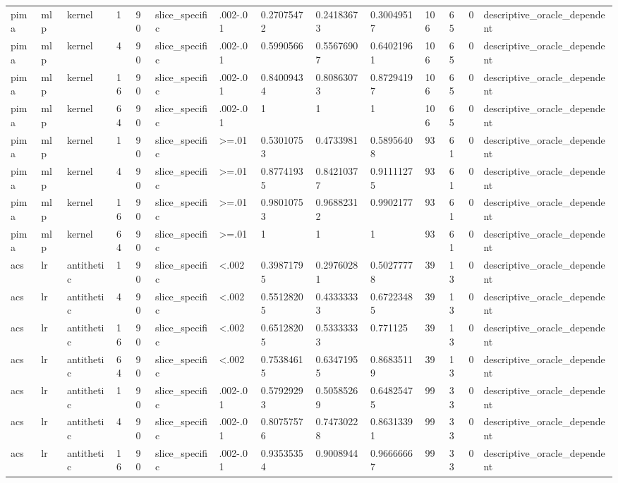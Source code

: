 \begin{tabular}{llllllllllllll}
pima & mlp & kernel & 1 & 90 & slice\_specific & .002-.01 & 0.27075472 & 0.24183673 & 0.30049517 & 106 & 65 & 0 & descriptive\_oracle\_dependent \\
pima & mlp & kernel & 4 & 90 & slice\_specific & .002-.01 & 0.5990566 & 0.55676907 & 0.64021961 & 106 & 65 & 0 & descriptive\_oracle\_dependent \\
pima & mlp & kernel & 16 & 90 & slice\_specific & .002-.01 & 0.84009434 & 0.80863073 & 0.87294197 & 106 & 65 & 0 & descriptive\_oracle\_dependent \\
pima & mlp & kernel & 64 & 90 & slice\_specific & .002-.01 & 1 & 1 & 1 & 106 & 65 & 0 & descriptive\_oracle\_dependent \\
pima & mlp & kernel & 1 & 90 & slice\_specific & >=.01 & 0.53010753 & 0.4733981 & 0.58956408 & 93 & 61 & 0 & descriptive\_oracle\_dependent \\
pima & mlp & kernel & 4 & 90 & slice\_specific & >=.01 & 0.87741935 & 0.84210377 & 0.91111275 & 93 & 61 & 0 & descriptive\_oracle\_dependent \\
pima & mlp & kernel & 16 & 90 & slice\_specific & >=.01 & 0.98010753 & 0.96882312 & 0.9902177 & 93 & 61 & 0 & descriptive\_oracle\_dependent \\
pima & mlp & kernel & 64 & 90 & slice\_specific & >=.01 & 1 & 1 & 1 & 93 & 61 & 0 & descriptive\_oracle\_dependent \\
acs & lr & antithetic & 1 & 90 & slice\_specific & <.002 & 0.39871795 & 0.29760281 & 0.50277778 & 39 & 13 & 0 & descriptive\_oracle\_dependent \\
acs & lr & antithetic & 4 & 90 & slice\_specific & <.002 & 0.55128205 & 0.43333333 & 0.67223485 & 39 & 13 & 0 & descriptive\_oracle\_dependent \\
acs & lr & antithetic & 16 & 90 & slice\_specific & <.002 & 0.65128205 & 0.53333333 & 0.771125 & 39 & 13 & 0 & descriptive\_oracle\_dependent \\
acs & lr & antithetic & 64 & 90 & slice\_specific & <.002 & 0.75384615 & 0.63471955 & 0.86835119 & 39 & 13 & 0 & descriptive\_oracle\_dependent \\
acs & lr & antithetic & 1 & 90 & slice\_specific & .002-.01 & 0.57929293 & 0.50585269 & 0.64825475 & 99 & 33 & 0 & descriptive\_oracle\_dependent \\
acs & lr & antithetic & 4 & 90 & slice\_specific & .002-.01 & 0.80757576 & 0.74730228 & 0.86313391 & 99 & 33 & 0 & descriptive\_oracle\_dependent \\
acs & lr & antithetic & 16 & 90 & slice\_specific & .002-.01 & 0.93535354 & 0.9008944 & 0.96666667 & 99 & 33 & 0 & descriptive\_oracle\_dependent \\

\end{tabular}
